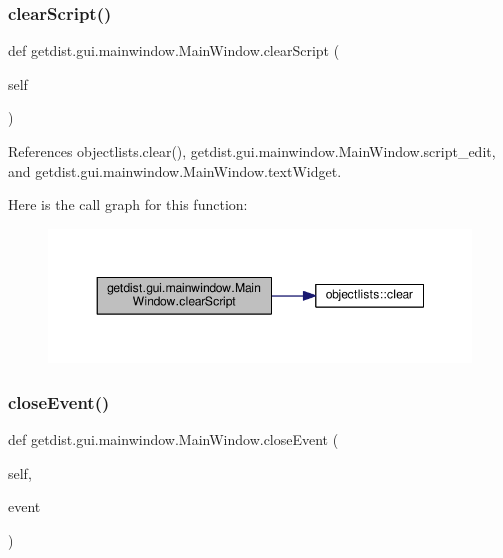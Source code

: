 \subsubsection{\texorpdfstring{clear\+Script()}{clearScript()}}
{\footnotesize\ttfamily def getdist.\+gui.\+mainwindow.\+Main\+Window.\+clear\+Script (\begin{DoxyParamCaption}\item[{}]{self }\end{DoxyParamCaption})}



References objectlists.\+clear(), getdist.\+gui.\+mainwindow.\+Main\+Window.\+script\+\_\+edit, and getdist.\+gui.\+mainwindow.\+Main\+Window.\+text\+Widget.

Here is the call graph for this function\+:
\nopagebreak
\begin{figure}[H]
\begin{center}
\leavevmode
\includegraphics[width=348pt]{classgetdist_1_1gui_1_1mainwindow_1_1MainWindow_a42a1bf08b1097561275a5910945b0b7f_cgraph}
\end{center}
\end{figure}
\mbox{\label{classgetdist_1_1gui_1_1mainwindow_1_1MainWindow_aeb3af901563e3a12835412c7c44e9e7c}} 
\subsubsection{\texorpdfstring{close\+Event()}{closeEvent()}}
{\footnotesize\ttfamily def getdist.\+gui.\+mainwindow.\+Main\+Window.\+close\+Event (\begin{DoxyParamCaption}\item[{}]{self,  }\item[{}]{event }\end{DoxyParamCaption})}



